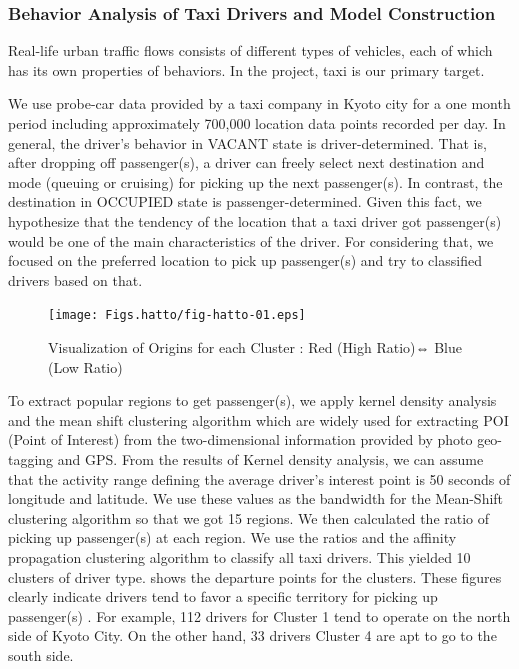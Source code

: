 \subsubsection{Behavior Analysis of Taxi Drivers and Model Construction}

Real-life urban traffic flows consists of different types of vehicles, each of which has its own properties of behaviors. In the project, taxi is our primary target. 

We use probe-car data provided by a taxi company in Kyoto city for a one month period including approximately 700,000 location data points recorded per day.
%
In general, the driver's behavior in VACANT state is driver-determined. That is, after dropping off passenger(s), a driver can freely select next destination and mode (queuing or cruising) for picking up the next passenger(s). In contrast, the destination in OCCUPIED state is passenger-determined. Given this fact, we hypothesize that the tendency of the location that a taxi driver got passenger(s) would be one of the main characteristics of the driver. For considering that, we focused on the preferred location to pick up passenger(s) and try to classified drivers based on that. 

\begin{figure}
  \centering
  \texttt{[image: Figs.hatto/fig-hatto-01.eps]}
  \caption{Visualization of Origins for each Cluster : Red (High Ratio)⇔ Blue (Low Ratio)}
  \label{fig:Figs.hatto/fig-hatto-01.eps}
\end{figure}

To extract popular regions to get passenger(s), we apply kernel density analysis and the mean shift clustering algorithm which are widely used for extracting POI (Point of Interest) from the two-dimensional information provided by photo geo-tagging and GPS. From the results of Kernel density analysis, we can assume that the activity range defining the average driver's interest point is 50 seconds of longitude and latitude.  We use these values as the bandwidth for the Mean-Shift clustering algorithm so that we got 15 regions. We then calculated the ratio of picking up passenger(s) at each region. We use the ratios and the affinity propagation clustering algorithm to classify all taxi drivers. This yielded 10 clusters of driver type.
 shows the departure points for the clusters. These figures clearly indicate drivers tend to favor a specific territory for picking up passenger(s) . For example, 112 drivers for Cluster 1 tend to operate on the north side of Kyoto City. On the other hand, 33 drivers Cluster 4 are apt to go to the south side. 

